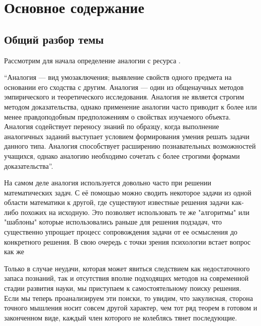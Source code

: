 \section{Основное содержание}

\subsection{Общий разбор темы}
Рассмотрим для начала определение аналогии с ресурса \cite{psychologsru}.

\begin{displayquote}
  ``Аналогия --- вид умозаключения; выявление свойств одного предмета на
  основании его сходства с другим. Аналогия --- один из общенаучных методов
  эмпирического и теоретического исследования. Аналогия не является строгим
  методом доказательства, однако применение аналогии часто приводит к более или
  менее правдоподобным предположениям о свойствах изучаемого объекта. Аналогия
  содействует переносу знаний по образцу, когда выполнение аналогичных заданий
  выступает условием формирования умения решать задачи данного типа. Аналогия
  способствует расширению познавательных возможностей учащихся, однако аналогию
  необходимо сочетать с более строгими формами доказательства''.
\end{displayquote}

На самом деле аналогия используется довольно часто при решении математических
задач. С её помощью можно сводить некоторое задачи из одной области математики
к другой, где существуют известные решения задачи как-либо похожих на исходную.
Это позволяет использовать те же "алгоритмы" или "шаблоны" которые
использовались раньше для решения подзадач, что существенно упрощает процесс
сопровождения задачи от ее осмысления до конкретного решения. В свою очередь
с точки зрения психологии встает вопрос как же 

Только в случае неудачи, которая может явиться следствием как недостаточного
запаса познаний, так и отсутствия вполне подходящих методов на современной
стадии развития науки, мы приступаем к самостоятельному поиску решения. Если мы
теперь проанализируем эти поиски, то увидим, что закулисная, сторона точного
мышления носит совсем другой характер, чем тот ряд теорем в готовом и
законченном виде, каждый член которого не колеблясь тянет последующие.

